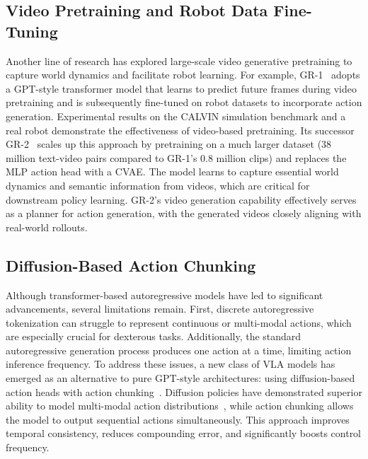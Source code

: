 \documentclass[10pt, a4paper, logo, copyright]{googledeepmind} %
\begin{document}
\subsection{Video Pretraining and Robot Data Fine-Tuning}
Another line of research has explored large-scale video generative pretraining to capture world dynamics and facilitate robot learning. 
For example, GR-1~\cite{wu2023unleashinglargescalevideogenerative} adopts a GPT-style transformer model that learns to predict future frames during video pretraining and is subsequently fine-tuned on robot datasets to incorporate action generation. Experimental results on the CALVIN simulation benchmark and a real robot demonstrate the effectiveness of video-based pretraining. Its successor GR-2~\cite{cheang2024gr2generativevideolanguageactionmodel} scales up this approach by pretraining on a much larger dataset (38 million text-video pairs compared to GR-1’s 0.8 million clips) and replaces the MLP action head with a CVAE. The model learns to capture essential world dynamics and semantic information from videos, which are critical for downstream policy learning. GR-2’s video generation capability effectively serves as a planner for action generation, with the generated videos closely aligning with real-world rollouts.

\subsection{Diffusion-Based Action Chunking}
Although transformer-based autoregressive models have led to significant advancements, several limitations remain. First, discrete autoregressive tokenization can struggle to represent continuous or multi-modal actions, which are especially crucial for dexterous tasks. Additionally, the standard autoregressive generation process produces one action at a time, limiting action inference frequency. To address these issues, a new class of VLA models has emerged as an alternative to pure GPT-style architectures: using diffusion-based action heads with action chunking~\cite{ActionChunking}. Diffusion policies have demonstrated superior ability to model multi-modal action distributions~\cite{Chi2023DiffusionPV}, while action chunking allows the model to output sequential actions simultaneously. This approach improves temporal consistency, reduces compounding error, and significantly boosts control frequency.
\end{document}
